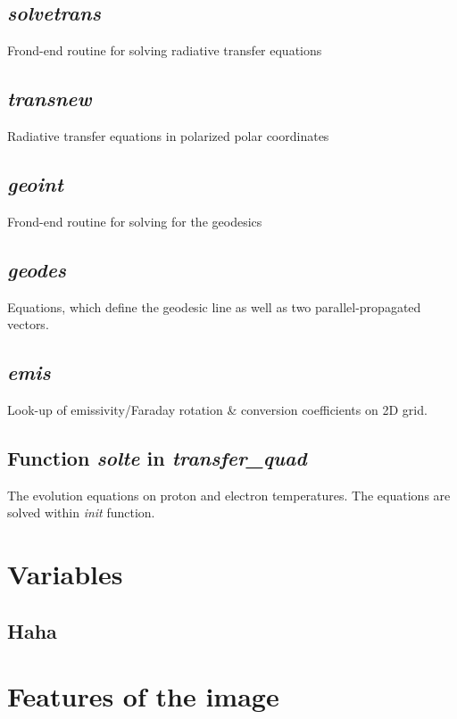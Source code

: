 \documentclass{emulateapj}
\begin{document}
\subsection{\textit{solvetrans}}
Frond-end routine for solving radiative transfer equations
\subsection{\textit{transnew}}
Radiative transfer equations in polarized polar coordinates
\subsection{\textit{geoint}}
Frond-end routine for solving for the geodesics
\subsection{\textit{geodes}}
Equations, which define the geodesic line as well as two parallel-propagated vectors.
\subsection{\textit{emis}}
Look-up of emissivity/Faraday rotation \& conversion coefficients on 2D grid.
\subsection{Function \textit{solte} in \textit{transfer\_quad}}
The evolution equations on proton and electron temperatures. The equations are solved within \textit{init} function.

\section{Variables}

\subsection{Haha}


\section{Features of the image}





\end{document}
